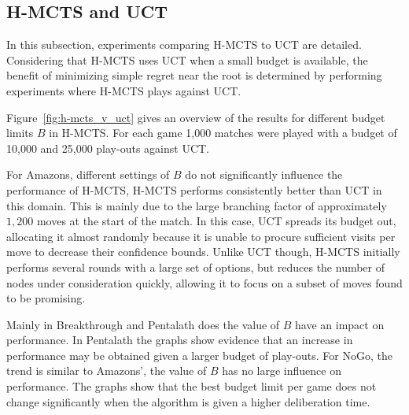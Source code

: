 \documentclass{kecsmstr}
\begin{document}
\subsection{H-MCTS and UCT}
\label{subsec:hmcts_uct}

In this subsection, experiments comparing H-MCTS to UCT are detailed. Considering that H-MCTS uses UCT when a small budget is available, the benefit of minimizing simple regret near the root is determined by performing experiments where H-MCTS plays against UCT.



Figure~\ref{fig:h-mcts_v_uct} gives an overview of the results for different budget limits $B$ in H-MCTS. For each game 1,000 matches were played with a budget of 10,000 and 25,000 play-outs against UCT. 

For Amazons, different settings of $B$ do not significantly influence the performance of H-MCTS, H-MCTS performs consistently better than UCT in this domain. This is mainly due to the large branching factor of approximately $1,200$ moves at the start of the match. In this case, UCT spreads its budget out, allocating it almost randomly because it is unable to procure sufficient visits per move to decrease their confidence bounds. Unlike UCT though, H-MCTS initially performs several rounds with a large set of options, but reduces the number of nodes under consideration quickly, allowing it to focus on a subset of moves found to be promising. 

Mainly in Breakthrough and Pentalath does the value of $B$ have an impact on performance. In Pentalath the graphs show evidence that an increase in performance may be obtained given a larger budget of play-outs. For NoGo, the trend is similar to Amazons', the value of $B$ has no large influence on performance. The graphs show that the best budget limit per game does not change significantly when the algorithm is given a higher deliberation time. 
\end{document}

